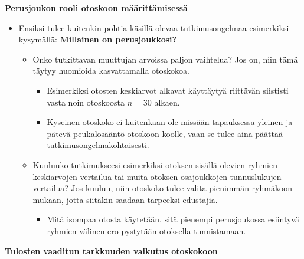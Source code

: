 \documentclass[
]{book}
\providecommand{\tightlist}{%
  \setlength{\itemsep}{0pt}\setlength{\parskip}{0pt}}
\begin{document}
\hfill\break

\textbf{Perusjoukon rooli otoskoon määrittämisessä}

\begin{itemize}
\tightlist
\item
  Ensiksi tulee kuitenkin pohtia käsillä olevaa tutkimusongelmaa esimerkiksi kysymällä: \textbf{Millainen on perusjoukkosi?}

  \begin{itemize}
  \tightlist
  \item
    Onko tutkittavan muuttujan arvoissa paljon vaihtelua? Jos on, niin tämä täytyy huomioida kasvattamalla otoskokoa.

    \begin{itemize}
    \tightlist
    \item
      Esimerkiksi otosten keskiarvot alkavat käyttäytyä riittävän siististi vasta noin otoskoosta \(n=30\) alkaen.
    \item
      Kyseinen otoskoko ei kuitenkaan ole missään tapauksessa yleinen ja pätevä peukalosääntö otoskoon koolle, vaan se tulee aina päättää tutkimusongelmakohtaisesti.
    \end{itemize}
  \item
    Kuuluuko tutkimukseesi esimerkiksi otoksen sisällä olevien ryhmien keskiarvojen vertailua tai muita otoksen osajoukkojen tunnuslukujen vertailua? Jos kuuluu, niin otoskoko tulee valita pienimmän ryhmäkoon mukaan, jotta siitäkin saadaan tarpeeksi edustajia.

    \begin{itemize}
    \tightlist
    \item
      Mitä isompaa otosta käytetään, sitä pienempi perusjoukossa esiintyvä ryhmien välinen ero pystytään otoksella tunnistamaan.
    \end{itemize}
  \end{itemize}
\end{itemize}

\textbf{Tulosten vaaditun tarkkuuden vaikutus otoskokoon}
\end{document}
